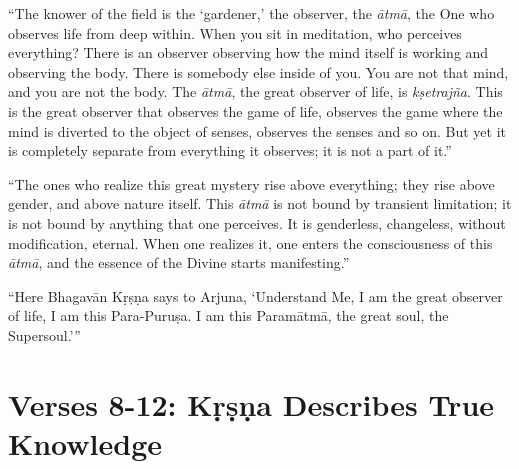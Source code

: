 \documentclass[12pt, twoside, openright]{memoir}
\begin{document}
\enquote{The knower of the field is the \enquote{gardener,} the observer, the \textit{ātmā}, the One who observes life from deep within. When you sit in meditation, who perceives everything? There is an observer observing how the mind itself is working and observing the body. There is somebody else inside of you. You are not that mind, and you are not the body. The \textit{ātmā}, the great observer of life, is \textit{kṣetrajña}. This is the great observer that observes the game of life, observes the game where the mind is diverted to the object of senses, observes the senses and so on. But yet it is completely separate from everything it observes; it is not a part of it.}

\enquote{The ones who realize this great mystery rise above everything; they rise above gender, and above nature itself. This \textit{ātmā} is not bound by transient limitation; it is not bound by anything that one perceives. It is genderless, changeless, without modification, eternal. When one realizes it, one enters the consciousness of this \textit{ātmā}, and the essence of the Divine starts manifesting.}

\enquote{Here Bhagavān Kṛṣṇa says to Arjuna, \enquote{Understand Me, I am the great observer of life, I am this Para-Puruṣa. I am this Paramātmā, the great soul, the Supersoul.}}

\section{Verses 8-12: Kṛṣṇa Describes True Knowledge}\label{sec-verses-8-12-krishna-describes-true-knowledge}
\end{document}
